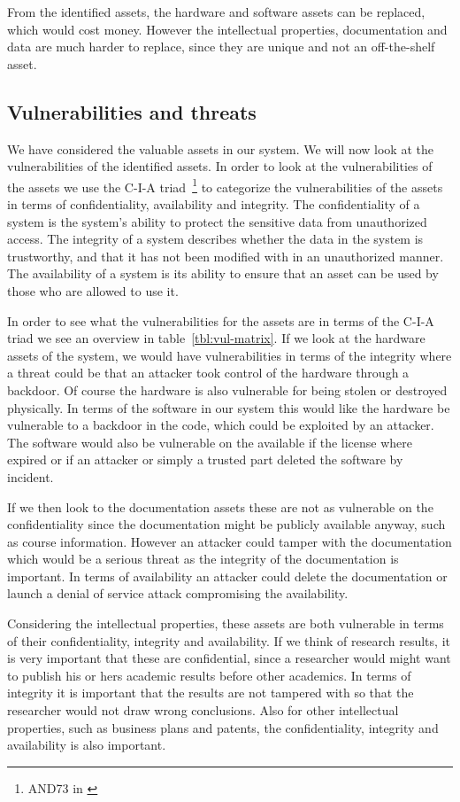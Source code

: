 From the identified assets, the hardware and software assets can be
replaced, which would cost money. However the intellectual properties,
documentation and data are much harder to replace, since they are
unique and not an off-the-shelf asset.

\subsection{Vulnerabilities and threats}
We have considered the valuable assets in our system. We will now look
at the vulnerabilities of the identified assets. In order to look at
the vulnerabilities of the assets we use the C-I-A
triad~\footnote{AND73 in \cite{pfleeger}} to categorize the
vulnerabilities of the assets in terms of confidentiality,
availability and integrity. The confidentiality of a system is the
system’s ability to protect the sensitive data from unauthorized
access. The integrity of a system describes whether the data in the
system is trustworthy, and that it has not been modified with in an
unauthorized manner. The availability of a system is its ability to
ensure that an asset can be used by those who are allowed to use it.

In order to see what the vulnerabilities for the assets are in terms
of the C-I-A triad we see an overview in
table~\ref{tbl:vul-matrix}. If we look at the hardware assets of the
system, we would have vulnerabilities in terms of the integrity where
a threat could be that an attacker took control of the hardware
through a backdoor. Of course the hardware is also vulnerable for
being stolen or destroyed physically. In terms of the software in our
system this would like the hardware be vulnerable to a backdoor in the
code, which could be exploited by an attacker. The software would also
be vulnerable on the available if the license where expired or if an
attacker or simply a trusted part deleted the software by incident.

If we then look to the documentation assets these are not as
vulnerable on the confidentiality since the documentation might be
publicly available anyway, such as course information. However an
attacker could tamper with the documentation which would be a serious
threat as the integrity of the documentation is important. In terms of
availability an attacker could delete the documentation or launch a
denial of service attack compromising the availability.

Considering the intellectual properties, these assets are both
vulnerable in terms of their confidentiality, integrity and
availability. If we think of research results, it is very important
that these are confidential, since a researcher would might want to
publish his or hers academic results before other academics. In terms
of integrity it is important that the results are not tampered with so
that the researcher would not draw wrong conclusions. Also for other
intellectual properties, such as business plans and patents, the
confidentiality, integrity and availability is also important.

